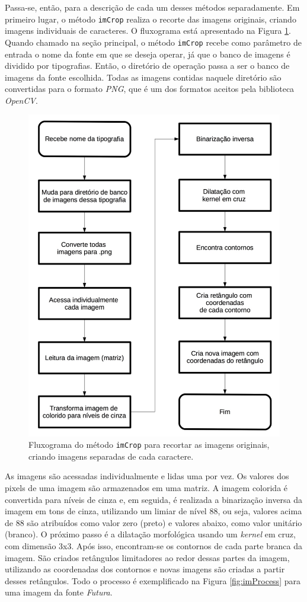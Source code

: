 Passa-se, então, para a descrição de cada um desses métodos separadamente. Em primeiro lugar, o método \texttt{imCrop} realiza o recorte das imagens originais, criando imagens individuais de caracteres. O fluxograma está apresentado na Figura \ref{fig:flowimCrop}. Quando chamado na seção principal, o método \texttt{imCrop} recebe como parâmetro de entrada o nome da fonte em que se deseja operar, já que o banco de imagens é dividido por tipografias. Então, o diretório de operação passa a ser o banco de imagens da fonte escolhida. Todas as imagens contidas naquele diretório são convertidas para o formato \textit{PNG}, que é um dos formatos aceitos pela biblioteca \textit{OpenCV}.


\begin{figure}[H]
  \centering
  \includegraphics[width=0.6\linewidth]{figuras/imCrop.pdf}
  \caption{Fluxograma do método \texttt{imCrop} para recortar as imagens originais, criando imagens separadas de cada caractere.}
  \label{fig:flowimCrop}
\end{figure}

As imagens são acessadas individualmente e lidas uma por vez. Os valores dos pixels de uma imagem são armazenados em uma matriz. A imagem colorida é convertida para níveis de cinza e, em seguida, é realizada a binarização inversa da imagem em tons de cinza, utilizando um limiar de nível 88, ou seja, valores acima de 88 são atribuídos como valor zero (preto) e valores abaixo, como valor unitário (branco). O próximo passo é a dilatação morfológica usando um \textit{kernel} em cruz, com dimensão 3x3. Após isso, encontram-se os contornos de cada parte branca da imagem. São criados retângulos limitadores ao redor dessas partes da imagem, utilizando as coordenadas dos contornos e novas imagens são criadas a partir desses retângulos. Todo o processo é exemplificado na Figura \ref{fig:imProcess} para uma imagem da fonte \textit{Futura}.



